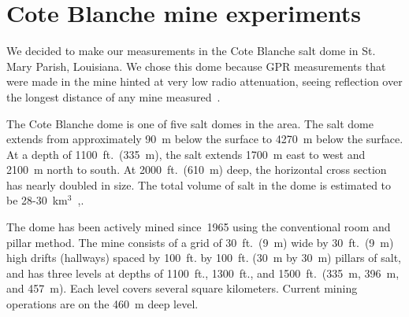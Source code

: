 \documentclass{article}
\begin{document}
  \section{Cote Blanche mine experiments}
  We decided to make our measurements in the Cote Blanche salt dome in St. Mary Parish, Louisiana.  
  We chose this dome because GPR measurements that were made in the mine
  hinted at very low radio attenuation, seeing reflection over the longest 
  distance of any mine measured~\cite{unterberger}.  
  
  The Cote Blanche dome is one of five 
  salt domes in the area.  The salt dome extends from approximately 90~m below the 
  surface to 4270~m below the surface.  At a depth of 1100~ft.~(335~m), the salt 
  extends 1700~m east to west and 2100~m north to south.  At 2000~ft.~(610~m) deep, 
  the horizontal cross section has nearly doubled in size.   The total volume of 
  salt in the dome is estimated to be 28-30~km$^3$~\cite{halbouty},\cite{cherryelog}.
  
  The dome has been actively mined since~1965 using the 
  conventional room and pillar method.  The mine consists of a grid of 30~ft.~(9~m) 
  wide by 30~ft.~(9~m) high drifts (hallways) spaced by 100~ft. by 100~ft. (30~m by 30~m)
  pillars of salt, and has three levels at depths of 1100~ft., 1300~ft., 
  and 1500~ft.~(335~m, 396~m, and 457~m).  Each level covers 
  several square kilometers.  Current mining operations are on the 460~m deep level.  
  
\end{document}
